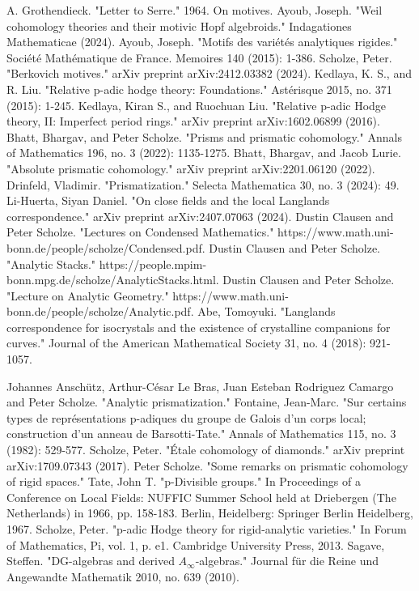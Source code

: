 \documentclass[12pt]{article}
\theoremstyle{definition}
\begin{document}
\begin{thebibliography}{}
 A. Grothendieck. "Letter to Serre." 1964. On motives.
 Ayoub, Joseph. "Weil cohomology theories and their motivic Hopf algebroids." Indagationes Mathematicae (2024).
 Ayoub, Joseph. "Motifs des vari\'et\'es analytiques rigides." Soci\'et\'e Math\'ematique de France. Memoires 140 (2015): 1-386.
 Scholze, Peter. "Berkovich motives." arXiv preprint arXiv:2412.03382 (2024).
 Kedlaya, K. S., and R. Liu. "Relative p-adic hodge theory: Foundations." Ast\'erisque 2015, no. 371 (2015): 1-245.
 Kedlaya, Kiran S., and Ruochuan Liu. "Relative p-adic Hodge theory, II: Imperfect period rings." arXiv preprint arXiv:1602.06899 (2016).
 Bhatt, Bhargav, and Peter Scholze. "Prisms and prismatic cohomology." Annals of Mathematics 196, no. 3 (2022): 1135-1275.
 Bhatt, Bhargav, and Jacob Lurie. "Absolute prismatic cohomology." arXiv preprint arXiv:2201.06120 (2022).
 Drinfeld, Vladimir. "Prismatization." Selecta Mathematica 30, no. 3 (2024): 49.
 Li-Huerta, Siyan Daniel. "On close fields and the local Langlands correspondence." arXiv preprint arXiv:2407.07063 (2024).
 Dustin Clausen and Peter Scholze. "Lectures on Condensed Mathematics." https://www.math.uni-bonn.de/people/scholze/Condensed.pdf.
 Dustin Clausen and Peter Scholze. "Analytic Stacks." https://people.mpim-bonn.mpg.de/scholze/AnalyticStacks.html.
 Dustin Clausen and Peter Scholze. "Lecture on Analytic Geometry." https://www.math.uni-bonn.de/people/scholze/Analytic.pdf.
 Abe, Tomoyuki. "Langlands correspondence for isocrystals and the existence of crystalline companions for curves." Journal of the American Mathematical Society 31, no. 4 (2018): 921-1057.

 Johannes Ansch\"utz, Arthur-C\'esar Le Bras, Juan Esteban Rodriguez Camargo and Peter Scholze. "Analytic prismatization." 
 Fontaine, Jean-Marc. "Sur certains types de repr\'esentations p-adiques du groupe de Galois d'un corps local; construction d'un anneau de Barsotti-Tate." Annals of Mathematics 115, no. 3 (1982): 529-577.
 Scholze, Peter. "\'Etale cohomology of diamonds." arXiv preprint arXiv:1709.07343 (2017).
 Peter Scholze. "Some remarks on prismatic cohomology of rigid spaces."
 Tate, John T. "p-Divisible groups." In Proceedings of a Conference on Local Fields: NUFFIC Summer School held at Driebergen (The Netherlands) in 1966, pp. 158-183. Berlin, Heidelberg: Springer Berlin Heidelberg, 1967.
 Scholze, Peter. "p-adic Hodge theory for rigid-analytic varieties." In Forum of Mathematics, Pi, vol. 1, p. e1. Cambridge University Press, 2013.
 Sagave, Steffen. "DG-algebras and derived $A_\infty$-algebras." Journal f\"ur die Reine und Angewandte Mathematik 2010, no. 639 (2010).


\end{thebibliography}
\end{document}
